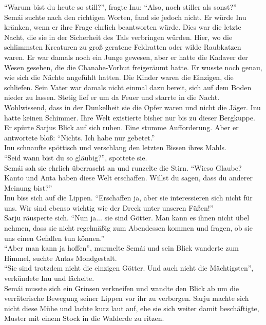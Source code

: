 ``Warum bist du heute so still?'', fragte Inu: ``Also, noch stiller als sonst?''\\
Semái suchte nach den richtigen Worten, fand sie jedoch nicht. Er würde Inu kränken, wenn er ihre 
Frage ehrlich beantworten würde. Dies war die letzte Nacht, die sie in der Sicherheit des Tals 
verbringen würden. Hier, wo die schlimmsten Kreaturen zu groß geratene Feldratten oder wilde 
Raubkatzen waren. Er war damals noch ein Junge gewesen, aber er hatte die Kadaver der Wesen 
gesehen, die die Chanahe-Vorhut freigeräumt hatte. Er wusste noch genau, wie sich die Nächte 
angefühlt hatten. Die Kinder waren die Einzigen, die schliefen. Sein Vater war damals nicht einmal 
dazu bereit, sich auf dem Boden nieder zu lassen. Stetig lief er um da Feuer und starrte in die 
Nacht. Wohlwissend, dass in der Dunkelheit sie die Opfer waren und nicht die Jäger. Inu hatte 
keinen Schimmer. Ihre Welt existierte bisher nur bis zu dieser Bergkuppe. Er spürte Sarjus Blick 
auf sich ruhen. Eine stumme Aufforderung. Aber er antwortete bloß: ``Nichts. Ich habe nur 
gebetet.''\\
Inu schnaufte spöttisch und verschlang den letzten Bissen ihres Mahls.\\
``Seid wann bist du so gläubig?'', spottete sie.\\
Semái sah sie ehrlich überrascht an und runzelte die Stirn. ``Wieso Glaube? Kanto und Anta haben 
diese Welt erschaffen. Willst du sagen, dass du anderer Meinung bist?''\\
Inu biss sich auf die Lippen. ``Erschaffen ja, aber sie interessieren sich nicht für uns. Wir sind 
ebenso wichtig wie der Dreck unter unseren Füßen!''\\
Sarju räusperte sich. ``Nun ja... sie sind Götter. Man kann es ihnen nicht übel nehmen, dass sie 
nicht regelmäßig zum Abendessen kommen und fragen, ob sie uns einen Gefallen tun können.''\\
``Aber man kann ja hoffen'', murmelte Semái und sein Blick wanderte zum Himmel, suchte Antas 
Mondgestalt.\\
``Sie sind trotzdem nicht die einzigen Götter. Und auch nicht die Mächtigsten'', verkündete Inu und 
lächelte.\\
Semái musste sich ein Grinsen verkneifen und wandte den Blick ab um die verräterische Bewegung 
seiner Lippen vor ihr zu verbergen. Sarju machte sich nicht diese Mühe und lachte kurz laut auf, 
ehe sie sich weiter damit beschäftigte, Muster mit einem Stock in die Walderde zu ritzen.\\
